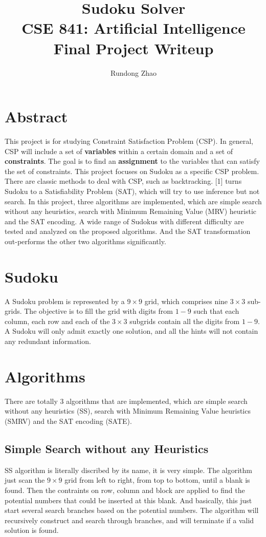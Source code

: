 \documentclass[11pt]{article}
\begin{document}
 
\title{Sudoku Solver \large  \\ CSE 841: Artificial Intelligence Final Project Writeup}
\author{Rundong Zhao}
\maketitle
 
\section {Abstract}
This project is for studying Constraint Satisfaction Problem (CSP). In general, CSP will include a set of \textbf{variables} within a certain domain and a set of \textbf{constraints}.  The goal is to find an \textbf{assignment} to the variables that can satisfy the set of constraints. This project focuses on Sudoku as a specific CSP problem. There are classic methods to deal with CSP, such as backtracking. [1] turns Sudoku to a Satisfiability Problem (SAT), which will try to use inference but not search. In this project, three algorithms are implemented, which are simple search without any heuristics, search with Minimum Remaining Value (MRV) heuristic and the SAT encoding. A wide range of Sudokus with different difficulty are tested and analyzed on the proposed algorithms. And the SAT transformation out-performs the other two algorithms significantly.

\section {Sudoku}
A Sudoku problem is represented by a $9 \times 9$ grid, which comprises nine $3 \times 3$ sub-grids. The objective is to fill the grid with digits from $1 - 9$ such that each column, each row and each of the $3 \times 3$ subgrids contain all the digits from $1 - 9$. A Sudoku will only admit exactly one solution, and all the hints will not contain any redundant information.

\section {Algorithms}
There are totally 3 algorithms that are implemented, which are simple search without any heuristics (SS), search with Minimum Remaining Value heuristics (SMRV) and the SAT encoding (SATE).

\subsection {Simple Search without any Heuristics}
SS algorithm is literally discribed by its name, it is very simple. The algorithm just scan the $9 \times 9$ grid from left to right, from top to bottom, until a blank is found. Then the contraints on row, column and block are applied to find the potential numbers that could be inserted at this blank. And basically, this just start several search branches based on the potential numbers. The algorithm will recursively construct and search through branches, and will terminate if a valid solution is found. 
\end{document}
